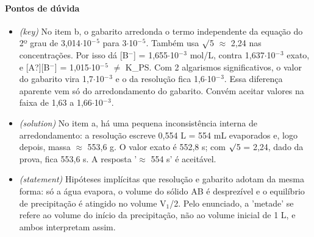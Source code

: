 \documentclass{article}%
\begin{document}
\paragraph{Pontos de dúvida}%
\begin{itemize}%
\item%
\textit{(key)} No item b, o gabarito arredonda o termo independente da equação do 2º grau de 3,014$\cdot$10$^{-}$$^{5}$ para 3$\cdot$10$^{-}$$^{5}$. Também usa $\surd$5 $\approx$ 2,24 nas concentrações. Por isso dá {[}B$^{-}${]} = 1,655$\cdot$10$^{-}$$^3$ mol/L, contra 1,637$\cdot$10$^{-}$$^3$ exato, e {[}A?{]}{[}B$^{-}${]} = 1,015$\cdot$10$^{-}$$^{5}$ $\neq$ K\_PS. Com 2 algarismos significativos, o valor do gabarito vira 1,7$\cdot$10$^{-}$$^3$ e o da resolução fica 1,6$\cdot$10$^{-}$$^3$. Essa diferença aparente vem só do arredondamento do gabarito. Convém aceitar valores na faixa de 1,63 a 1,66$\cdot$10$^{-}$$^3$.%
\item%
\textit{(solution)} No item a, há uma pequena inconsistência interna de arredondamento: a resolução escreve 0,554 L = 554 mL evaporados e, logo depois, massa $\approx$ 553,6 g. O valor exato é 552,8 s; com $\surd$5 = 2,24, dado da prova, fica 553,6 s. A resposta '$\approx$ 554 s' é aceitável.%
\item%
\textit{(statement)} Hipóteses implícitas que resolução e gabarito adotam da mesma forma: só a água evapora, o volume do sólido AB é desprezível e o equilíbrio de precipitação é atingido no volume V$_{1}$/2. Pelo enunciado, a 'metade' se refere ao volume do início da precipitação, não ao volume inicial de 1 L, e ambos interpretam assim.%
\end{itemize}%
\end{document}
